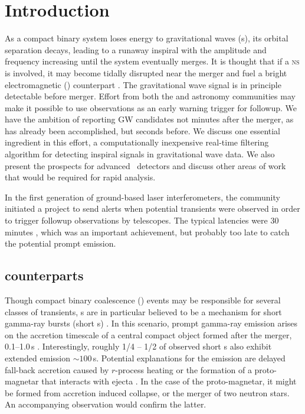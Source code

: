 \section{Introduction}
\label{sec:introduction}

As a compact binary system loses energy to gravitational waves (\GW{}s), its
orbital separation decays, leading to a runaway inspiral with the \GW{}
amplitude and frequency increasing until the system eventually merges.  It is
thought that if a \textsc{ns} is involved, it may become tidally disrupted near
the merger and fuel a bright electromagnetic (\EM{}) counterpart
\citep{shibata:2007}.  The gravitational wave signal is in principle detectable
before merger.  Effort from both the \GW{} and astronomy communities may make
it possible to use \GW{} observations as an early warning trigger for \EM{}
followup.  We have the ambition of reporting GW candidates not minutes after
the merger, as has already been accomplished, but seconds before.  We discuss
one essential ingredient in this effort, a computationally inexpensive
real-time filtering algorithm for detecting inspiral signals in gravitational
wave data.  We also present the prospects for advanced \GW\ detectors and
discuss other areas of work that would be required for rapid analysis.  

In the first generation of ground-based laser interferometers, the \GW{}
community initiated a project to send alerts when potential \GW{} transients
were observed in order to trigger followup observations by \EM{} telescopes.
The typical latencies were 30 minutes \citep{HugheyGWPAW2011}, which was an
important achievement, but probably too late to catch the potential prompt
\EM{} emission. 

\subsection{\EM{} counterparts}

Though compact binary coalescence (\CBC{}) events may be responsible for
several classes of \EM{} transients, \CBC{}s are in particular believed to be a
mechanism for short gamma-ray bursts (short \GRB{}s) \citep{Lee:2005, nakar07}.
In this scenario, prompt gamma-ray emission arises on the accretion timescale
of a central compact object formed after the merger, 0.1--1.0\,s
\citep{Janka1999}.  Interestingly, roughly 1/4 -- 1/2 of observed short \GRB{}s
also exhibit extended emission $\sim100$\,s.  Potential explanations for the
emission are delayed fall-back accretion \citep{Metzger2010} caused by
$r$-process heating or the formation of a proto-magnetar that interacts with
ejecta \citep{Bucciantini2011}.  In the case of the proto-magnetar, it might be
formed from accretion induced collapse, or the merger of two neutron stars.  An
accompanying \GW{} observation would confirm the latter.

